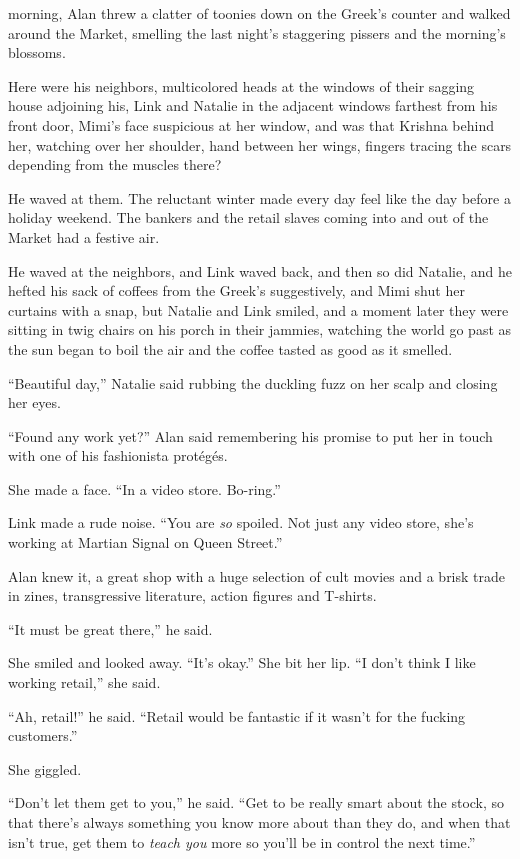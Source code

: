  morning, Alan threw a clatter of toonies down on the Greek's
counter and walked around the Market, smelling the last night's
staggering pissers and the morning's blossoms.

Here were his neighbors, multicolored heads at the windows of their
sagging house adjoining his, Link and Natalie in the adjacent windows
farthest from his front door, Mimi's face suspicious at her window,
and was that Krishna behind her, watching over her shoulder, hand
between her wings, fingers tracing the scars depending from the
muscles there?

He waved at them.  The reluctant winter made every day feel like the
day before a holiday weekend.  The bankers and the retail slaves
coming into and out of the Market had a festive air.

He waved at the neighbors, and Link waved back, and then so did
Natalie, and he hefted his sack of coffees from the Greek's
suggestively, and Mimi shut her curtains with a snap, but Natalie and
Link smiled, and a moment later they were sitting in twig chairs on
his porch in their jammies, watching the world go past as the sun
began to boil the air and the coffee tasted as good as it smelled.

``Beautiful day,'' Natalie said rubbing the duckling fuzz on her scalp
and closing her eyes.

``Found any work yet?'' Alan said remembering his promise to put her
in touch with one of his fashionista prot\'{e}g\'{e}s.

She made a face.  ``In a video store.  Bo-ring.''

Link made a rude noise.  ``You are \textit{so} spoiled.  Not just any
video store, she's working at Martian Signal on Queen Street.''

Alan knew it, a great shop with a huge selection of cult movies and a
brisk trade in zines, transgressive literature, action figures and
T-shirts.

``It must be great there,'' he said.

She smiled and looked away.  ``It's okay.'' She bit her lip.  ``I
don't think I like working retail,'' she said.

``Ah, retail!'' he said.  ``Retail would be fantastic if it wasn't for
the fucking customers.''

She giggled.

``Don't let them get to you,'' he said.  ``Get to be really smart
about the stock, so that there's always something you know more about
than they do, and when that isn't true, get them to \textit{teach you}
more so you'll be in control the next time.''

